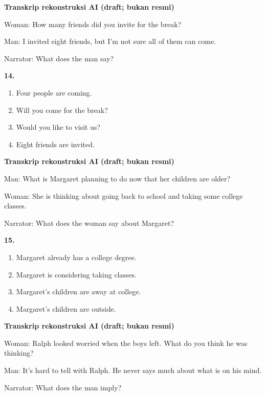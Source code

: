 \documentclass[12pt]{article}
\begin{document}
\par
\vspace{0.25\baselineskip}
\begin{exampleblock}
\textbf{Transkrip rekonstruksi AI (draft; bukan resmi)}\par
Woman: How many friends did you invite for the break?\par
Man: I invited eight friends, but I'm not sure all of them can come.\par
Narrator: What does the man say?\par
\end{exampleblock}
\noindent\textbf{14.}
\begin{enumerate}[label=(\Alph*),leftmargin=*,itemsep=0.2em]
\item Four people are coming.
\item Will you come for the break?
\item Would you like to visit us?
\item Eight friends are invited.
\end{enumerate}
\par
\vspace{0.25\baselineskip}
\begin{exampleblock}
\textbf{Transkrip rekonstruksi AI (draft; bukan resmi)}\par
Man: What is Margaret planning to do now that her children are older?\par
Woman: She is thinking about going back to school and taking some college classes.\par
Narrator: What does the woman say about Margaret?\par
\end{exampleblock}
\noindent\textbf{15.}
\begin{enumerate}[label=(\Alph*),leftmargin=*,itemsep=0.2em]
\item Margaret already has a college degree.
\item Margaret is considering taking classes.
\item Margaret's children are away at college.
\item Margaret's children are outside.
\end{enumerate}
\par
\vspace{0.25\baselineskip}
\begin{exampleblock}
\textbf{Transkrip rekonstruksi AI (draft; bukan resmi)}\par
Woman: Ralph looked worried when the boys left. What do you think he was thinking?\par
Man: It's hard to tell with Ralph. He never says much about what is on his mind.\par
Narrator: What does the man imply?\par
\end{exampleblock}
\end{document}

